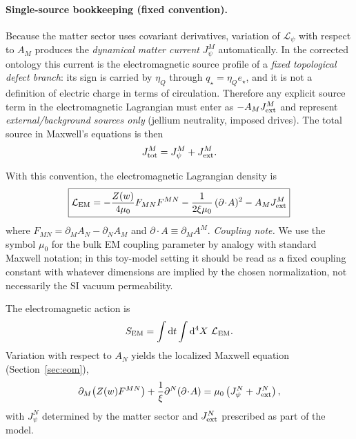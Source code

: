 \documentclass[11pt]{article}
\newcommand{\etaQ}{\eta_Q}
\newcommand{\estar}{e_\star}
\newcommand{\qstar}{q_\star}
\begin{document}
\paragraph{Single-source bookkeeping (fixed convention).}
Because the matter sector uses covariant derivatives, variation of $\mathcal L_\psi$ with respect to $A_M$ produces the \emph{dynamical matter current} $J_\psi^M$ automatically. In the corrected ontology this current is the electromagnetic source profile of a \emph{fixed topological defect branch}: its sign is carried by $\etaQ$ through $\qstar=\etaQ\estar$, and it is not a definition of electric charge in terms of circulation. Therefore any explicit source term in the electromagnetic Lagrangian must enter as $-A_M J_{\rm ext}^M$ and represent \emph{external/background sources only} (jellium neutrality, imposed drives). The total source in Maxwell's equations is then
\begin{equation}
J_{\rm tot}^M = J_\psi^M + J_{\rm ext}^M.
\end{equation}

With this convention, the electromagnetic Lagrangian density is
\begin{equation}
\boxed{
\mathcal L_{\rm EM}
=
-\frac{Z(w)}{4\mu_0} F_{MN}F^{MN}
-\frac{1}{2\xi\mu_0}\,(\partial\!\cdot\!A)^2
- A_M J_{\rm ext}^M
}
\label{eq:LEM}
\end{equation}
where $F_{MN}=\partial_M A_N-\partial_N A_M$ and $\partial\!\cdot\!A\equiv \partial_M A^M$.
\noindent\emph{Coupling note.} We use the symbol $\mu_0$ for the bulk EM coupling parameter by analogy with standard Maxwell notation; in this toy-model setting it should be read as a fixed coupling constant with whatever dimensions are implied by the chosen normalization, not necessarily the SI vacuum permeability.

The electromagnetic action is
\begin{equation}
S_{\rm EM}=\int \dd t \int \dd^4X\ \mathcal L_{\rm EM}.
\end{equation}
Variation with respect to $A_N$ yields the localized Maxwell equation (Section~\ref{sec:eom}),
\begin{equation}
\partial_M\!\left(Z(w)F^{MN}\right)+\frac{1}{\xi}\partial^N(\partial\!\cdot\!A)=\mu_0\left(J_\psi^N+J_{\rm ext}^N\right),
\end{equation}
with $J_\psi^N$ determined by the matter sector and $J_{\rm ext}^N$ prescribed as part of the model.
\end{document}
